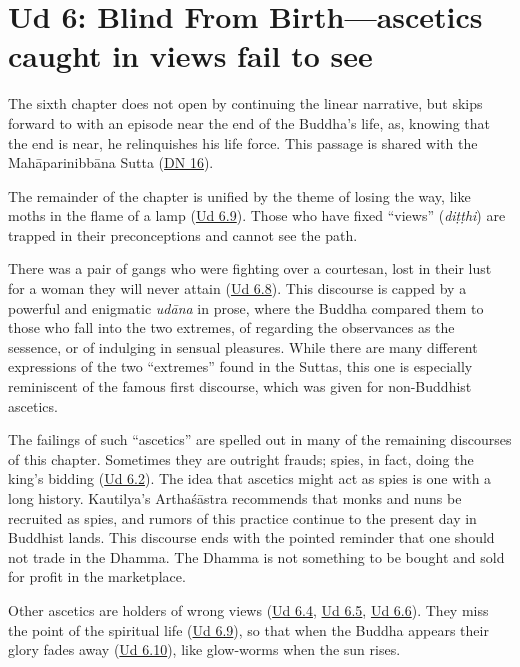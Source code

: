 \documentclass[12pt,openany]{book}%
\begin{document}
\section*{Ud 6: Blind From Birth—ascetics caught in views fail to see}

The sixth chapter does not open by continuing the linear narrative, but skips forward to with an episode near the end of the Buddha’s life, as, knowing that the end is near, he relinquishes his life force. This passage is shared with the \textsanskrit{Mahāparinibbāna} Sutta (\href{https://suttacentral.net/dn16/en/sujato}{DN 16}). 

The remainder of the chapter is unified by the theme of losing the way, like moths in the flame of a lamp (\href{https://suttacentral.net/ud6.9/en/sujato}{Ud 6.9}). Those who have fixed “views” (\textit{\textsanskrit{diṭṭhi}}) are trapped in their preconceptions and cannot see the path.

There was a pair of gangs who were fighting over a courtesan, lost in their lust for a woman they will never attain (\href{https://suttacentral.net/ud6.8/en/sujato}{Ud 6.8}). This discourse is capped by a powerful and enigmatic \textit{\textsanskrit{udāna}} in prose, where the Buddha compared them to those who fall into the two extremes, of regarding the observances as the sessence, or of indulging in sensual pleasures. While there are many different expressions of the two “extremes” found in the Suttas, this one is especially reminiscent of the famous first discourse, which was given for non-Buddhist ascetics.

The failings of such “ascetics” are spelled out in many of the remaining discourses of this chapter. Sometimes they are outright frauds; spies, in fact, doing the king’s bidding (\href{https://suttacentral.net/ud6.2/en/sujato}{Ud 6.2}). The idea that ascetics might act as spies is one with a long history. Kautilya’s \textsanskrit{Arthaśāstra} recommends that monks and nuns be recruited as spies, and rumors of this practice continue to the present day in Buddhist lands. This discourse ends with the pointed reminder that one should not trade in the Dhamma. The Dhamma is not something to be bought and sold for profit in the marketplace.

Other ascetics are holders of wrong views (\href{https://suttacentral.net/ud6.4/en/sujato}{Ud 6.4}, \href{https://suttacentral.net/ud6.5/en/sujato}{Ud 6.5}, \href{https://suttacentral.net/ud6.6/en/sujato}{Ud 6.6}). They  miss the point of the spiritual life (\href{https://suttacentral.net/ud6.9/en/sujato}{Ud 6.9}), so that when the Buddha appears their glory fades away (\href{https://suttacentral.net/ud6.10/en/sujato}{Ud 6.10}), like glow-worms when the sun rises.
\end{document}
